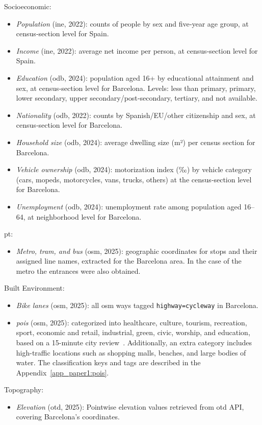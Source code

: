   { \setlength{\parskip}{0.45\parskip}%
  Socioeconomic:
  \begin{itemize}
    \item \emph{Population} (\acs{ine}, 2022): counts of people by sex and five‐year age group, at census‐section level for Spain.
    \item \emph{Income} (\acs{ine}, 2022): average net income per person, at census‐section level for Spain.
    \item \emph{Education} (\acs{odb}, 2024): population aged 16+ by educational attainment and sex, at census‐section level for Barcelona. Levels: less than primary, primary, lower secondary, upper secondary/post‐secondary, tertiary, and not available.
    \item \emph{Nationality} (\acs{odb}, 2022): counts by Spanish/EU/other citizenship and sex, at census‐section level for Barcelona.
    \item \emph{Household size} (\acs{odb}, 2024): average dwelling size (m²) per census section for Barcelona.
    \item \emph{Vehicle ownership} (\acs{odb}, 2024): motorization index (‰) by vehicle category (cars, mopeds, motorcycles, vans, trucks, others) at the census‐section level for Barcelona.
    \item \emph{Unemployment} (\acs{odb}, 2024): unemployment rate among population aged 16–64, at neighborhood level for Barcelona.
  \end{itemize}

  \ac{pt}:
  \begin{itemize}
    \item \emph{Metro, tram, and bus} (\acs{osm}, 2025): geographic coordinates for stops and their assigned line names, extracted for the Barcelona area. In the case of the metro the entrances were also obtained. 
  \end{itemize}

  Built Environment:
  \begin{itemize}
    \item \emph{Bike lanes} (\acs{osm}, 2025): all \acs{osm} ways tagged \texttt{highway=cycleway} in Barcelona.
    \item \emph{\acp{poi}} (\acs{osm}, 2025): categorized into healthcare, culture, tourism, recreation, sport, economic and retail, industrial, green, civic, worship, and education, based on a 15-minute city review~\cite{Papadopoulos2023}. Additionally, an extra category includes high-traffic locations such as shopping malls, beaches, and large bodies of water. The classification keys and tags are described in the Appendix~\ref{app_paper1:pois}.
  \end{itemize}

  Topography:
  \begin{itemize}
    \item \emph{Elevation} (\acs{otd}, 2025): Pointwise elevation values retrieved from \ac{otd} API, covering Barcelona's coordinates.
  \end{itemize}
  }


